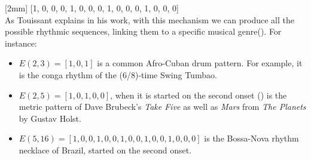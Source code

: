 \documentclass[main.tex]{subfiles}
\begin{document}
[2mm]
[1, 0, 0, 0, 1, 0, 0, 0, 1, 0, 0, 0, 1, 0, 0, 0]\\
[3mm]
As Touissant explains in his work\cite{Toussaint:2004:euclidean:rhythm}, with this mechanism we can produce all the possible rhythmic sequences, linking them to a specific musical genre(). For instance:
\begin{itemize}[noitemsep]
\item \begin{math}E(2,3)=[1,0,1]\end{math} is a common Afro-Cuban drum pattern. For example, it is the conga rhythm of the (6/8)-time Swing Tumbao\cite{Klower:1997}.
\item \begin{math}E(2,5)=[1,0,1,0,0]\end{math}, when it is started on the second onset (\begin{math}[1,0,0,1,0]\end{math}) is the metric pattern of Dave Brubeck’s \textit{Take Five} as well as \textit{Mars} from \textit{The Planets} by Gustav Holst\cite{Keith:1991}.
\item \begin{math}E(5,16)=[1,0,0,1,0,0,1,0,0,1,0,0,1,0,0,0]\end{math} is the Bossa-Nova rhythm necklace of Brazil, started on the second onset\cite{Behague:1973}.
\end{itemize}
\end{document}
